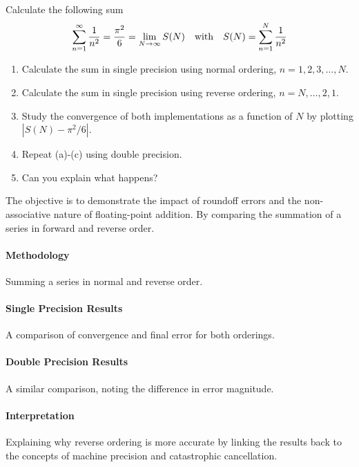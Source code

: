 \begin{exercise} Calculate the following sum
    $$
      \sum_{n=1}^\infty {1\over n^2}={\pi^2\over 6}
      =\lim_{N\to\infty} S(N)
      \quad
      \text{with}
      \quad
      S(N)=\sum_{n=1}^N {1\over n^2}
    $$
    \begin{enumerate}
        \item Calculate the sum in single precision using normal ordering, $n=1,2,3,\ldots,N$.
        \item Calculate the sum in single precision using reverse ordering, $n=N,\ldots,2,1$.
        \item Study the convergence of both implementations as a function of $N$ by plotting $|S(N)-\pi^2/6|$.
        \item Repeat (a)-(c) using double precision.
        \item Can you explain what happens?
    \end{enumerate}

    The objective is to demonstrate the impact of roundoff errors and the non-associative nature of floating-point addition. By comparing the summation of a series in forward and reverse order.

    \paragraph{Methodology} Summing a series in normal and reverse order.

    \paragraph{Single Precision Results} A comparison of convergence and final error for both orderings.

    \paragraph{Double Precision Results} A similar comparison, noting the difference in error magnitude.
    \paragraph{Interpretation} Explaining why reverse ordering is more accurate by linking the results back to the concepts of machine precision and catastrophic cancellation.

\end{exercise}

